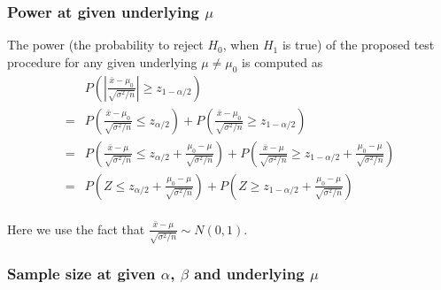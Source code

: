 \documentclass[a4paper,12pt]{article}
\begin{document}
\subsubsection{Power at given underlying $\mu$}
\label{sec:power-at-given}

The power (the probability to reject $H_0$, when $H_1$ is true) of the proposed test procedure for any given underlying $\mu \neq \mu_0$ is computed as
\begin{equation}
  \label{eq:power_equation_one_sample_sigma_known}
  \begin{aligned}
    & P\left(
      \left|
        \frac{\bar{x} - \mu_0}{\sqrt{\sigma^2 / n}}
      \right|
      \geq z_{1 - \alpha / 2}
    \right)    \\
    = & P\left(
      \frac{\bar{x} - \mu_0}{\sqrt{\sigma^2 / n}}
      \leq z_{\alpha / 2}
    \right)
    + P\left(
      \frac{\bar{x} - \mu_0}{\sqrt{\sigma^2 / n}}
      \geq z_{1 - \alpha / 2}
    \right)    \\
    = & P\left(
      \frac{\bar{x} - \mu}{\sqrt{\sigma^2 / n}}
      \leq z_{\alpha / 2}
      + \frac{\mu_0 - \mu}{\sqrt{\sigma^2 / n}}
    \right)
    + P\left(
      \frac{\bar{x} - \mu}{\sqrt{\sigma^2 / n}}
      \geq z_{1 - \alpha / 2}
      + \frac{\mu_0 - \mu}{\sqrt{\sigma^2 / n}}
    \right)    \\
    = & P\left(
      Z
      \leq z_{\alpha / 2}
      + \frac{\mu_0 - \mu}{\sqrt{\sigma^2 / n}}
    \right)
    + P\left(
      Z
      \geq z_{1 - \alpha / 2}
      + \frac{\mu_0 - \mu}{\sqrt{\sigma^2 / n}}
    \right)    \\
  \end{aligned}  
\end{equation}

Here we use the fact that $  \frac{\bar{x} - \mu}{\sqrt{\sigma^2 / n}} \sim N\left(0, 1\right)$. 

\subsubsection{Sample size at given $\alpha$, $\beta$ and underlying $\mu$}
\label{sec:sample-size-at}
\end{document}
